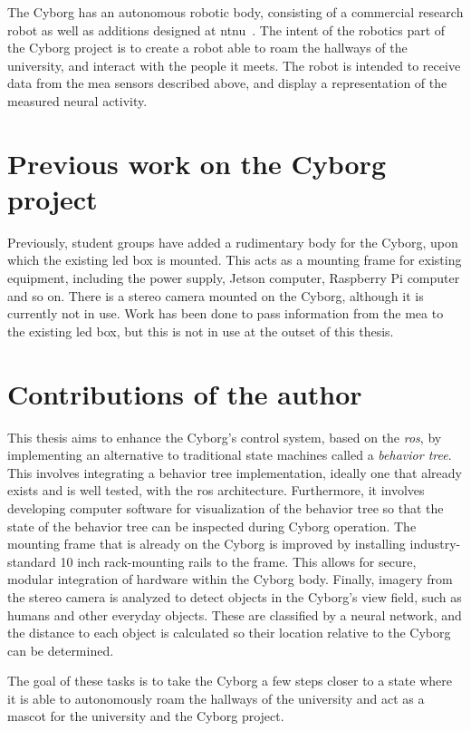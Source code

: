 \documentclass[\rootfolder/main.tex]{subfiles}
\begin{document}
The Cyborg has an autonomous robotic body, consisting of a commercial research robot as well as additions designed at \acrshort{ntnu}~\cite{Waløen2017}.
The intent of the robotics part of the Cyborg project is to create a robot able to roam the hallways of the university, and interact with the people it meets.
The robot is intended to receive data from the \acrshort{mea} sensors described above, and display a representation of the measured neural activity.

\section{Previous work on the Cyborg project}

Previously, student groups have added a rudimentary body for the Cyborg, upon which the existing \acrshort{led} box is mounted.
This acts as a mounting frame for existing equipment, including the power supply, Jetson computer, Raspberry Pi computer and so on.
There is a stereo camera mounted on the Cyborg, although it is currently not in use.
Work has been done to pass information from the \acrlong{mea} to the existing \acrshort{led} box, but this is not in use at the outset of this thesis.

\section{Contributions of the author}

This thesis aims to enhance the Cyborg's control system, based on the \emph{\acrfull{ros}}, by implementing an alternative to traditional state machines called a \emph{behavior tree}.
This involves integrating a behavior tree implementation, ideally one that already exists and is well tested, with the \acrshort{ros} architecture.
Furthermore, it involves developing computer software for visualization of the behavior tree so that the state of the behavior tree can be inspected during Cyborg operation.
The mounting frame that is already on the Cyborg is improved by installing industry-standard 10 inch rack-mounting rails to the frame.
This allows for secure, modular integration of hardware within the Cyborg body.
Finally, imagery from the stereo camera is analyzed to detect objects in the Cyborg's view field, such as humans and other everyday objects.
These are classified by a neural network, and the distance to each object is calculated so their location relative to the Cyborg can be determined.

The goal of these tasks is to take the Cyborg a few steps closer to a state where it is able to autonomously roam the hallways of the university and act as a mascot for the university and the Cyborg project.
\end{document}
